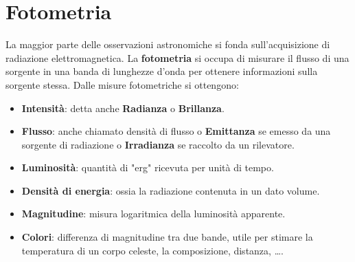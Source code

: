 \documentclass[a4paper, oneside]{book}
\begin{document}
\chapter{Fotometria}
La maggior parte delle osservazioni astronomiche si fonda sull'acquisizione di radiazione elettromagnetica. La \textbf{fotometria}
si occupa di misurare il flusso
di una sorgente in una banda di lunghezze d'onda per ottenere informazioni sulla sorgente stessa. Dalle
misure fotometriche si ottengono:
\begin{itemize}
    \item \textbf{Intensità}: detta anche \textbf{Radianza} o \textbf{Brillanza}.
    \item \textbf{Flusso}: anche chiamato densità di flusso o \textbf{Emittanza} se emesso da una sorgente di radiazione o \textbf{Irradianza} se raccolto da un rilevatore.
    \item \textbf{Luminosità}: quantità di "erg" ricevuta per unità di tempo.
    \item \textbf{Densità di energia}: ossia la radiazione contenuta in un dato volume.
    \item \textbf{Magnitudine}: misura logaritmica della luminosità apparente.
    \item \textbf{Colori}: differenza di magnitudine tra due bande, utile per stimare la temperatura di un corpo celeste, la composizione, distanza, \dots.
\end{itemize}
\end{document}
